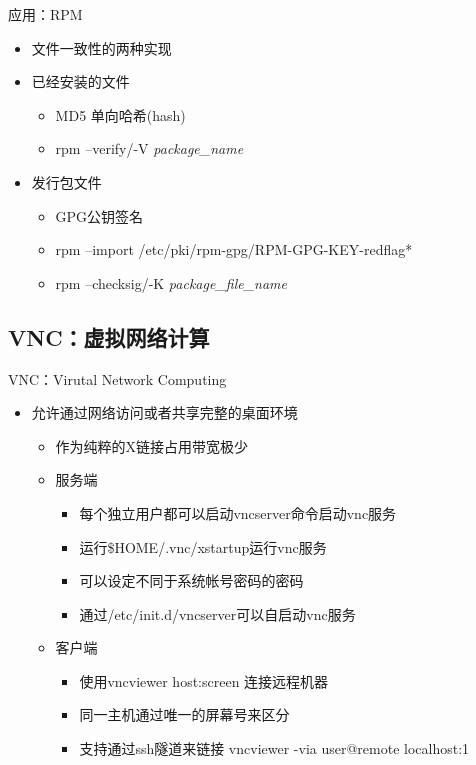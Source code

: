 \begin{frame}{应用：RPM}
\begin{itemize}
\item 文件一致性的两种实现
\item 已经安装的文件

\begin{itemize}
\item MD5 单向哈希(hash)
\item rpm --verify/-V \emph{package\_name}
\end{itemize}
\item 发行包文件

\begin{itemize}
\item GPG公钥签名
\item rpm --import /etc/pki/rpm-gpg/RPM-GPG-KEY-redflag{*}
\item rpm --checksig/-K \emph{package\_file\_name}
\end{itemize}
\end{itemize}

\end{frame} 
\subsection{VNC：虚拟网络计算}


\begin{frame}{VNC：Virutal Network Computing}
\begin{itemize}
\item 允许通过网络访问或者共享完整的桌面环境

\begin{itemize}
\item 作为纯粹的X链接占用带宽极少
\item 服务端

\begin{itemize}
\item 每个独立用户都可以启动vncserver命令启动vnc服务
\item 运行\$HOME/.vnc/xstartup运行vnc服务
\item 可以设定不同于系统帐号密码的密码
\item 通过/etc/init.d/vncserver可以自启动vnc服务
\end{itemize}
\item 客户端

\begin{itemize}
\item 使用vncviewer host:screen 连接远程机器
\item 同一主机通过唯一的屏幕号来区分
\item 支持通过ssh隧道来链接 vncviewer -via user@remote localhost:1
\end{itemize}
\end{itemize}
\end{itemize}

\end{frame} 
